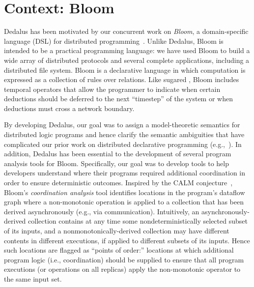 \section{Context: Bloom}
Dedalus has been motivated by our concurrent work on \emph{Bloom}, a
domain-specific language (DSL) for distributed programming~\cite{bloom}. Unlike
Dedalus, Bloom is intended to be a practical programming language: we have used
Bloom to build a wide array of distributed protocols and several complete
applications, including a distributed file system. Bloom is a declarative
language in which computation is expressed as a collection of rules over
relations. Like sugared \lang, Bloom includes temporal operators that allow the
programmer to indicate when certain deductions should be deferred to the next
``timestep'' of the system or when deductions must cross a network
boundary. %

By developing Dedalus, our goal was to assign a model-theoretic semantics for
distributed logic programs and hence clarify the semantic ambiguities that have
complicated our prior work on distributed declarative programming
(e.g.,~\cite{Mao2009,navarro-oper-sem}). In addition, Dedalus has been essential
to the development of several program analysis tools for Bloom. Specifically,
our goal was to develop tools to help developers understand where their programs
required additional coordination in order to ensure deterministic
outcomes. Inspired by the CALM conjecture~\cite{cidr11,declarative-imperative},
Bloom's \emph{coordination analysis} tool identifies locations in the program's
dataflow graph where a non-monotonic operation is applied to a collection that
has been derived asynchronously (e.g., via communication).  Intuitively, an
asynchronously-derived collection contains at any time some nondeterministically
selected subset of its inputs, and a nonmonotonically-derived collection may
have different contents in different executions, if applied to different subsets
of its inputs.  Hence such locations are flagged as ``points of order:''
locations at which additional program logic (i.e., coordination) should be
supplied to ensure that all program executions (or operations on all replicas)
apply the non-monotonic operator to the same input set.

